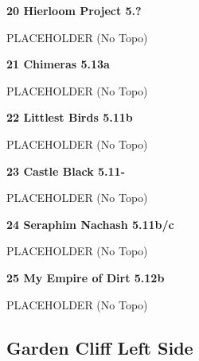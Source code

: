 \begin{multicols}{2}
\needspace{1.5cm}
\label{rt:Hierloom Project}
\colorbox{black!20}{
\parbox{0.95\linewidth}{
\textbf{
20 Hierloom Project 5.?  
}}}

\begin{adjustwidth}{0.5cm}{}			
PLACEHOLDER (No Topo)
\end{adjustwidth}



\needspace{1.5cm}
\label{rt:Chimeras}
\colorbox{Goldenrod!50}{
\parbox{0.95\linewidth}{
\textbf{
21 Chimeras 5.13a  
}}}

\begin{adjustwidth}{0.5cm}{}			
PLACEHOLDER (No Topo)
\end{adjustwidth}



\needspace{1.5cm}
\label{rt:Littlest Birds}
\colorbox{RoyalBlue!20}{
\parbox{0.95\linewidth}{
\textbf{
22 Littlest Birds 5.11b  
}}}

\begin{adjustwidth}{0.5cm}{}			
PLACEHOLDER (No Topo)
\end{adjustwidth}



\needspace{1.5cm}
\label{rt:Castle Black}
\colorbox{RoyalBlue!20}{
\parbox{0.95\linewidth}{
\textbf{
23 Castle Black 5.11-  
}}}

\begin{adjustwidth}{0.5cm}{}			
PLACEHOLDER (No Topo)
\end{adjustwidth}



\needspace{1.5cm}
\label{rt:Seraphim Nachash}
\colorbox{RoyalBlue!20}{
\parbox{0.95\linewidth}{
\textbf{
24 Seraphim Nachash 5.11b/c  
}}}

\begin{adjustwidth}{0.5cm}{}			
PLACEHOLDER (No Topo)
\end{adjustwidth}



\needspace{1.5cm}
\label{rt:My Empire of Dirt}
\colorbox{Goldenrod!50}{
\parbox{0.95\linewidth}{
\textbf{
25 My Empire of Dirt 5.12b  
}}}

\begin{adjustwidth}{0.5cm}{}			
PLACEHOLDER (No Topo)
\end{adjustwidth}




\needspace{1.5cm}
\subsection*{Garden Cliff Left Side}\label{bf:Garden Cliff Left Side}
	



\end{multicols}
